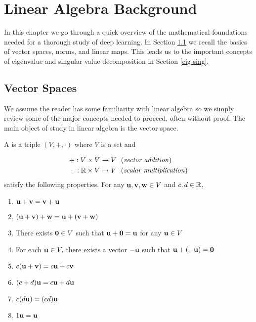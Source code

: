 
\chapter{Linear Algebra Background}


In this chapter we go through a quick overview of the mathematical foundations needed for a thorough study of deep learning. In Section \ref{vec-spaces} we recall the basics of vector spaces, norms, and linear maps. This leads us to the important concepts of eigenvalue and singular value decomposition in Section \ref{eig-sing}. 


\section{Vector Spaces}\label{vec-spaces}

We assume the reader has some familiarity with linear algebra so we simply review some of the major concepts needed to proceed, often without proof. The main object of study in linear algebra is the vector space.

\begin{definition}
A  is a triple $(V,+,\cdot)$ where $V$ is a set and

\begin{align*}
    +:V\times V\to V & \ \  \text{(\textit{vector addition})} \\
    \cdot\ :\R\times V\to V & \ \  \text{(\textit{scalar multiplication})}
\end{align*}
satisfy the following properties. For any $\vu, \vv, \vw \in V$ and $c, d \in \R$,
\begin{enumerate}
\item $\vu + \vv = \vv + \vu$ 
\item $(\vu + \vv) + \vw = \vu + (\vv + \vw)$ 
\item There exists $\vzero\in V$ such that $\vu + \vzero = \vu$ for any $\vu\in V$
\item For each $\vu \in V,$ there exists a vector $-\vu$ such that $\vu + (-\vu) = \vzero$
\item  $c(\vu + \vv) = c\vu + c\vv$
\item $(c+ d) \vu = c\vu + d\vu$
\item $c(d\vu) = (cd) \vu$
\item $1 \vu = \vu$
\end{enumerate}
\end{definition}

